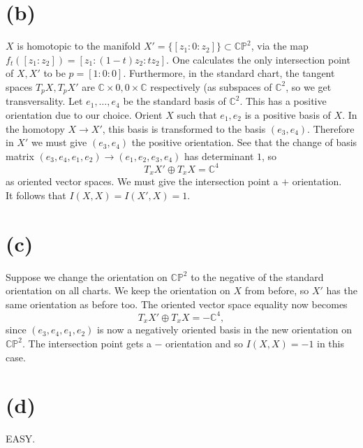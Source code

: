 \documentclass{amsbook}
\theoremstyle{theorem}
\theoremstyle{plain}
\theoremstyle{remark}
\newcommand{\C}{\mathbb C}
\renewcommand{\P}{\mathbb P}
\begin{document}
\section*{(b)}
$X$ is homotopic to the manifold $X' = \{[z_1:0:z_2]\} \subset \C\P^2$, via the map $f_t([z_1:z_2]) = [z_1: (1-t)z_2: tz_2]$. One calculates the only intersection point of $X,X'$ to be $p = [1:0:0]$. Furthermore, in the standard chart, the tangent spaces $T_pX, T_pX'$ are $\C\times 0, 0\times \C$ respectively (as subspaces of $\C^2$, so we get transversality. Let $e_1, \dots, e_4$ be the standard basis of $\C^2$. This has a positive orientation due to our choice. Orient $X$ such that $e_1, e_2$ is a positive basis of $X$. In the homotopy $X\to X'$, this basis is transformed to the basis $(e_3, e_4)$. Therefore in $X'$ we must give $(e_3, e_4)$ the positive orientation. See that the change of basis matrix $(e_3,e_4,e_1,e_2) \to (e_1,e_2,e_3,e_4)$ has determinant $1$, so \[T_xX'\oplus T_xX = \C^4\] as oriented vector spaces. We must give the intersection point a $+$ orientation.\\

It follows that $I(X,X) = I(X',X) = 1$.

\section*{(c)}

Suppose we change the orientation on $\C\P^2$ to the negative of the standard orientation on all charts. We keep the orientation on $X$ from before, so $X'$ has the same orientation as before too. The oriented vector space equality now becomes \[T_xX' \oplus T_xX = -\C^4,\] since $(e_3,e_4,e_1,e_2)$ is now a negatively oriented basis in the new orientation on $\C\P^2$. The intersection point gets a $-$ orientation and so $I(X,X) = -1$ in this case.

\section*{(d)}
EASY.





% 
% 

\end{document}
